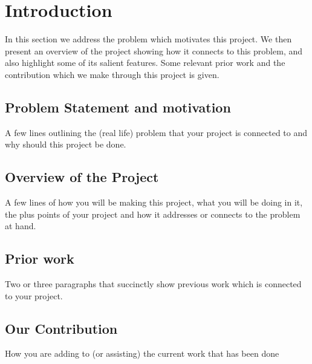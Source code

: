 \section{Introduction}
In this section we address the problem which motivates this project. We then present an overview of the project showing how it connects to this problem, and also highlight some of its salient features. Some relevant prior work and the contribution which we make through this project is given.

\subsection{Problem Statement and motivation}
A few lines outlining the (real life) problem that your project is connected to and why should this project be done.

\subsection{Overview of the Project}
A few lines of how you will be making this project, what you will be doing in it, the plus points of your project and how it addresses or connects to the problem at hand.

\subsection{Prior work}
Two or three paragraphs that succinctly show previous work which is connected to your project.

\subsection{Our Contribution}
How you are adding to (or assisting) the current work that has been done
